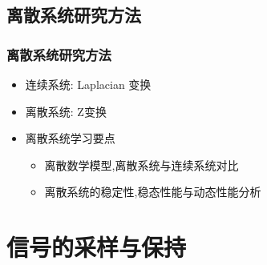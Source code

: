 \documentclass[table]{beamer}
\begin{document}
\subsection{离散系统研究方法}
\label{sec-1-4}
\begin{frame}
\frametitle{离散系统研究方法}
\label{sec-1-4-1}

\begin{itemize}
\item 连续系统: Laplacian 变换
\item <2->离散系统: Z变换
\item <3->离散系统学习要点
\begin{itemize}
\item <4->离散数学模型,离散系统与连续系统对比
\item <5->离散系统的稳定性,稳态性能与动态性能分析
\end{itemize}
\end{itemize}
\end{frame}
\section{信号的采样与保持}
\label{sec-2}
\end{document}
